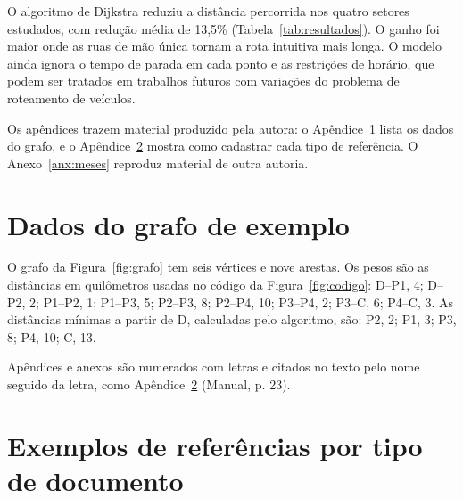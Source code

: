 \documentclass[tcc,capa]{texufpel}
\begin{document}
O algoritmo de Dijkstra reduziu a distância percorrida nos quatro setores
estudados, com redução média de 13,5\% (Tabela~\ref{tab:resultados}). O ganho
foi maior onde as ruas de mão única tornam a rota intuitiva mais longa. O
modelo ainda ignora o tempo de parada em cada ponto e as restrições de
horário, que podem ser tratados em trabalhos futuros com variações do problema
de roteamento de veículos.

Os apêndices trazem material produzido pela autora: o Apêndice~\ref{apx:dados}
lista os dados do grafo, e o Apêndice~\ref{apx:referencias} mostra como
cadastrar cada tipo de referência. O Anexo~\ref{anx:meses} reproduz material de
outra autoria.




\apendices

\chapter{Dados do grafo de exemplo}
\label{apx:dados}

O grafo da Figura~\ref{fig:grafo} tem seis vértices e nove arestas. Os pesos
são as distâncias em quilômetros usadas no código da
Figura~\ref{fig:codigo}: D--P1, 4; D--P2, 2; P1--P2, 1; P1--P3, 5; P2--P3, 8;
P2--P4, 10; P3--P4, 2; P3--C, 6; P4--C, 3. As distâncias mínimas a partir de
D, calculadas pelo algoritmo, são: P2, 2; P1, 3; P3, 8; P4, 10; C, 13.

Apêndices e anexos são numerados com letras e citados no texto pelo nome
seguido da letra, como Apêndice~\ref{apx:referencias} (Manual, p. 23).

\chapter{Exemplos de referências por tipo de documento}
\label{apx:referencias}
\end{document}
